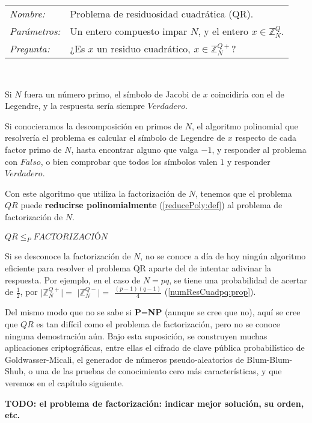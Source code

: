 \hfil

\begin{tabular}{|ll}
	\textit{Nombre:} & Problema de residuosidad cuadrática (QR). \\
	\textit{Parámetros:} & Un entero compuesto impar $N$, y el entero $x\in \mathbb{Z}^Q_N$. \\
	\textit{Pregunta:} & ¿Es $x$ un residuo cuadrático, $x \in \mathbb{Z}^{Q+}_N$? \\
\end{tabular}
\\

\hfil

Si $N$ fuera un número primo, el símbolo de Jacobi de $x$ coincidiría con el de Legendre, y la respuesta sería siempre $Verdadero$.

Si conocieramos la descomposición en primos de $N$, el algoritmo polinomial que resolvería el problema es calcular el símbolo de Legendre de $x$ respecto de cada factor primo de $N$, hasta encontrar alguno que valga $-1$, y responder al problema con $Falso$, o bien comprobar que todos los símbolos valen $1$ y responder $Verdadero$.

Con este algoritmo que utiliza la factorización de $N$, tenemos que el problema $QR$ puede \textbf{reducirse polinomialmente} (\ref{reducePoly:def}) al problema de factorización de $N$.

\begin{proposition}
	 $QR \leq_P FACTORIZACIÓN$
\end{proposition}

Si se desconoce la factorización de $N$, no se conoce a día de hoy ningún algoritmo eficiente para resolver el problema QR aparte del de intentar adivinar la respuesta. Por ejemplo, en el caso de $N=pq$, se tiene una probabilidad de acertar de $\frac{1}{2}$, por $\mid \mathbb{Z}_N^{Q+} \mid =$ $ \mid \mathbb{Z}_N^{Q-} \mid =$ $\frac{(p-1)(q-1)}{4}$ (\ref{numResCuadpq:prop}).


Del mismo modo que no se sabe si \textbf{P}=\textbf{NP} (aunque se cree que no), aquí se cree que $QR$ es tan difícil como el problema de factorización, pero no se conoce ninguna demostración aún. Bajo esta suposición, se construyen muchas aplicaciones criptográficas, entre ellas el cifrado de clave pública probabilístico de Goldwasser-Micali, el generador de números pseudo-aleatorios de Blum-Blum-Shub, o una de las pruebas de conocimiento cero más características, y que veremos en el capítulo siguiente.




\textbf{TODO: el problema de factorización: indicar mejor solución, su orden, etc.}